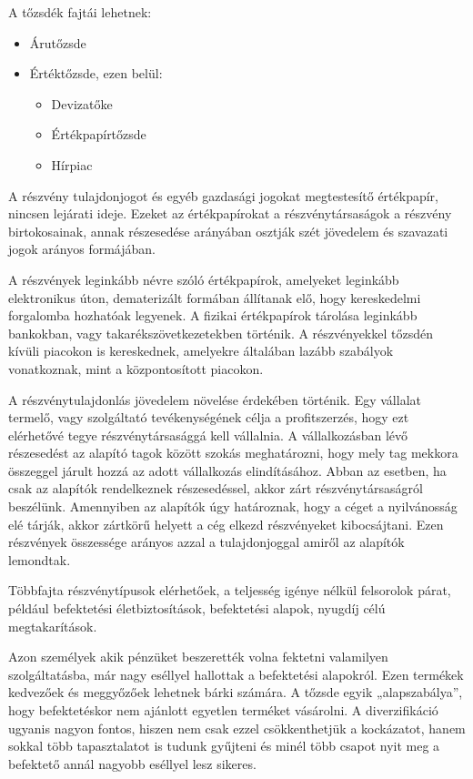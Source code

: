 A tőzsdék fajtái lehetnek: 

\begin{itemize}
\item Árutőzsde
\item Értéktőzsde, ezen belül: 
	\begin{itemize}
	     \item Devizatőke
	     \item Értékpapírtőzsde 
	     \item Hírpiac
	\end{itemize}
\end{itemize}


A részvény tulajdonjogot és egyéb gazdasági jogokat megtestesítő értékpapír, nincsen lejárati ideje. Ezeket az értékpapírokat a részvénytársaságok a részvény birtokosainak, annak részesedése arányában osztják szét jövedelem és szavazati jogok arányos formájában.

	A részvények leginkább névre szóló értékpapírok, amelyeket leginkább elektronikus úton, dematerizált formában állítanak elő, hogy kereskedelmi forgalomba hozhatóak legyenek. A fizikai értékpapírok tárolása leginkább bankokban, vagy takarékszövetkezetekben történik. A részvényekkel tőzsdén kívüli piacokon is kereskednek, amelyekre általában lazább szabályok vonatkoznak, mint a központosított piacokon. 

	A részvénytulajdonlás jövedelem növelése érdekében történik. Egy vállalat termelő, vagy szolgáltató tevékenységének célja a profitszerzés, hogy ezt elérhetővé tegye részvénytársasággá kell vállalnia. A vállalkozásban lévő részesedést az alapító tagok között szokás meghatározni, hogy mely tag mekkora összeggel járult hozzá az adott vállalkozás elindításához. Abban az esetben, ha csak az alapítók rendelkeznek részesedéssel, akkor zárt részvénytársaságról beszélünk. Amennyiben az alapítók úgy határoznak, hogy a céget a nyilvánosság elé tárják, akkor zártkörű helyett a cég elkezd részvényeket kibocsájtani. Ezen részvények összessége arányos azzal a tulajdonjoggal amiről az alapítók lemondtak.

	Többfajta részvénytípusok elérhetőek, a teljesség igénye nélkül felsorolok párat, például befektetési életbiztosítások, befektetési alapok, nyugdíj célú megtakarítások.\cite{wikiShare}


Azon személyek akik pénzüket beszerették volna fektetni valamilyen szolgáltatásba, már nagy eséllyel hallottak a befektetési alapokról. Ezen termékek kedvezőek és meggyőzőek lehetnek bárki számára. A tőzsde egyik „alapszabálya”, hogy befektetéskor nem ajánlott egyetlen terméket vásárolni. A diverzifikáció ugyanis nagyon fontos, hiszen nem csak ezzel csökkenthetjük a kockázatot, hanem sokkal több tapasztalatot is tudunk gyűjteni és minél több csapot nyit meg a befektető annál nagyobb eséllyel lesz sikeres.

